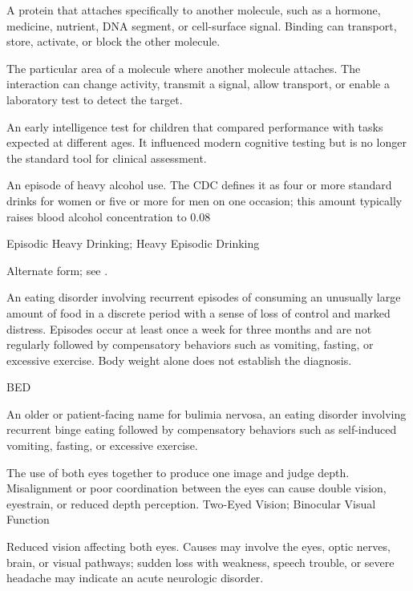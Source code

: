 A protein that attaches specifically to another molecule, such as a hormone, medicine, nutrient, DNA segment, or cell-surface signal. Binding can transport, store, activate, or block the other molecule.

 The particular area of a molecule where another molecule attaches. The interaction can change activity, transmit a signal, allow transport, or enable a laboratory test to detect the target.

 An early intelligence test for children that compared performance with tasks expected at different ages. It influenced modern cognitive testing but is no longer the standard tool for clinical assessment.

 An episode of heavy alcohol use. The CDC defines it as four or more standard drinks for women or five or more for men on one occasion; this amount typically raises blood alcohol concentration to 0.08%

\synonyms
Episodic Heavy Drinking; Heavy Episodic Drinking

 Alternate form; see .

 An eating disorder involving recurrent episodes of consuming an unusually large amount of food in a discrete period with a sense of loss of control and marked distress. Episodes occur at least once a week for three months and are not regularly followed by compensatory behaviors such as vomiting, fasting, or excessive exercise. Body weight alone does not establish the diagnosis.


\synonyms
BED

 An older or patient-facing name for bulimia nervosa, an eating disorder involving recurrent binge eating followed by compensatory behaviors such as self-induced vomiting, fasting, or excessive exercise.

 The use of both eyes together to produce one image and judge depth. Misalignment or poor coordination between the eyes can cause double vision, eyestrain, or reduced depth perception.
\synonyms
Two-Eyed Vision; Binocular Visual Function

 Reduced vision affecting both eyes. Causes may involve the eyes, optic nerves, brain, or visual pathways; sudden loss with weakness, speech trouble, or severe headache may indicate an acute neurologic disorder.


